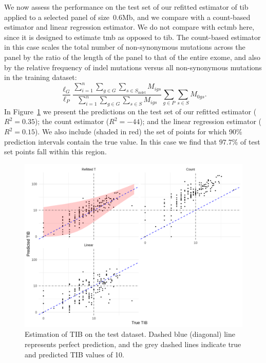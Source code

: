 \documentclass[../thesis.tex]{subfiles}
\begin{document}
We now assess the performance on the test set of our refitted estimator of \gls{tib} applied to a selected panel of size~0.6Mb, and we compare with a count-based estimator and linear regression estimator. We do not compare with \gls{ectmb} here, since it is designed to estimate \gls{tmb} as opposed to \gls{tib}.  The count-based estimator in this case scales the total number of non-synonymous mutations across the panel by the ratio of the length of the panel to that of the entire exome, and also by the relative frequency of indel mutations versus all non-synonymous mutations in the training dataset:
\[
\frac{\ell_G}{\ell_{P}} \frac{\sum_{i =1}^{n} \sum_{g \in G} \sum_{s \in S_{\text{indel}}} M_{igs}}{\sum_{i=1}^{n}\sum_{g \in G} \sum_{s \in S} M_{igs}}\sum_{g \in P} \sum_{s \in S} M_{0gs}.
\]
In Figure~\ref{fig:indel_predictions_figure} we present the predictions on the test set of our refitted estimator ($R^2 = 0.35$); the count estimator ($R^2 = -44$); and the linear regression estimator ($R^2 = 0.15$). We also include (shaded in red) the set of points for which 90\% prediction intervals contain the true value. In this case we find that $97.7 \%$ of test set points fall within this region.

\begin{figure}[htbp]
\centering
\includegraphics[width=5.5in]{figures/chapter3/fig10.png}
\vspace*{-5mm}
\caption{Estimation of TIB on the test dataset. Dashed blue (diagonal) line represents perfect prediction, and the grey dashed lines indicate true and predicted TIB values of 10. 
\label{fig:indel_predictions_figure}}
\vspace*{-2mm}
\end{figure} 
\end{document}
